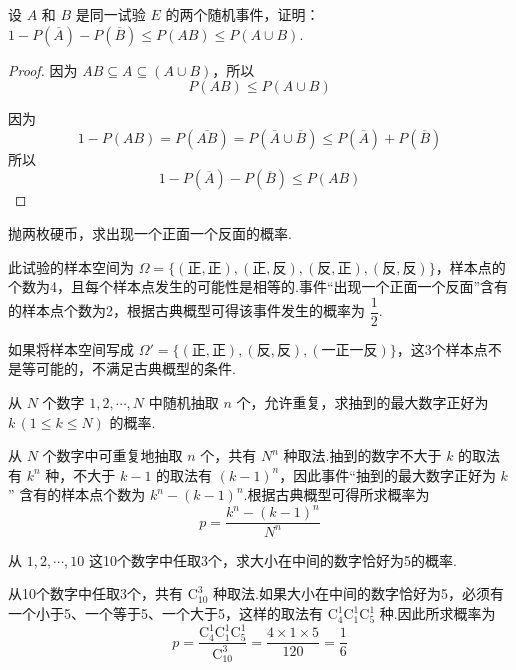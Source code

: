 \question 设 $A$ 和 $B$ 是同一试验 $E$ 的两个随机事件，证明：$1 - P(\overline{A}) - P(\overline{B}) \leqslant P(AB) \leqslant P(A \cup B)$.

\begin{proof}
    因为 $AB \subseteq A \subseteq (A \cup B)$，所以
    $$
    P(AB) \leqslant P(A \cup B)
    $$

    因为
    $$
    1 - P(AB) = P(\overline{AB}) = P(\overline{A} \cup \overline{B}) \leqslant P(\overline{A}) + P(\overline{B})
    $$
    所以
    $$
    1 - P(\overline{A}) - P(\overline{B}) \leqslant P(AB)
    $$
\end{proof}

\question 抛两枚硬币，求出现一个正面一个反面的概率.

\begin{solution}
    此试验的样本空间为 $\varOmega = \{ (\text{正}, \text{正}), (\text{正}, \text{反}), (\text{反}, \text{正}), (\text{反}, \text{反}) \}$，样本点的个数为4，且每个样本点发生的可能性是相等的.事件“出现一个正面一个反面”含有的样本点个数为2，根据古典概型可得该事件发生的概率为 $\dfrac{1}{2}$.
\end{solution}

\begin{note}
    \indent 如果将样本空间写成 $\varOmega' = \{ (\text{正}, \text{正}), (\text{反}, \text{反}), (\text{一正一反}) \}$，这3个样本点不是等可能的，不满足古典概型的条件.
\end{note}

\question 从 $N$ 个数字 $1,2,\cdots,N$ 中随机抽取 $n$ 个，允许重复，求抽到的最大数字正好为 $k \, (1 \leqslant k \leqslant N)$ 的概率.

\begin{solution}
    从 $N$ 个数字中可重复地抽取 $n$ 个，共有 $N^n$ 种取法.抽到的数字不大于 $k$ 的取法有 $k^n$ 种，不大于 $k-1$ 的取法有 $(k-1)^n$，因此事件“抽到的最大数字正好为 $k$” 含有的样本点个数为 $k^n - (k-1)^n$.根据古典概型可得所求概率为
    $$
    p = \dfrac{k^n - (k-1)^n}{N^n}
    $$
\end{solution}

\question 从 $1,2,\cdots,10$ 这10个数字中任取3个，求大小在中间的数字恰好为5的概率.

\begin{solution}
    从10个数字中任取3个，共有 $\mathrm{C}_{10}^3$ 种取法.如果大小在中间的数字恰好为5，必须有一个小于5、一个等于5、一个大于5，这样的取法有 $\mathrm{C}_4^1 \mathrm{C}_1^1 \mathrm{C}_5^1$ 种.因此所求概率为
    $$
    p = \dfrac{\mathrm{C}_4^1 \mathrm{C}_1^1 \mathrm{C}_5^1}{\mathrm{C}_{10}^3} = \dfrac{4 \times 1 \times 5}{120} = \dfrac{1}{6}
    $$
\end{solution}

